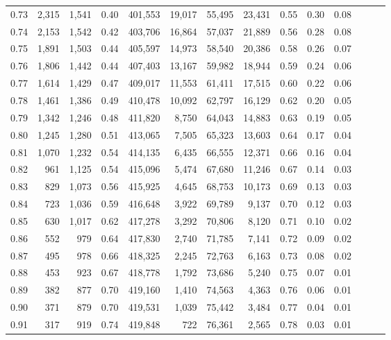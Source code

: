 \begin{tabular}{rrrrrrrrrrrrrr}
0.73 &  2,315 &  1,541 &  0.40 &  401,553 &   19,017 &  55,495 &  23,431 &  0.55 &  0.30 &      0.08 \\
0.74 &  2,153 &  1,542 &  0.42 &  403,706 &   16,864 &  57,037 &  21,889 &  0.56 &  0.28 &      0.08 \\
0.75 &  1,891 &  1,503 &  0.44 &  405,597 &   14,973 &  58,540 &  20,386 &  0.58 &  0.26 &      0.07 \\
0.76 &  1,806 &  1,442 &  0.44 &  407,403 &   13,167 &  59,982 &  18,944 &  0.59 &  0.24 &      0.06 \\
0.77 &  1,614 &  1,429 &  0.47 &  409,017 &   11,553 &  61,411 &  17,515 &  0.60 &  0.22 &      0.06 \\
0.78 &  1,461 &  1,386 &  0.49 &  410,478 &   10,092 &  62,797 &  16,129 &  0.62 &  0.20 &      0.05 \\
0.79 &  1,342 &  1,246 &  0.48 &  411,820 &    8,750 &  64,043 &  14,883 &  0.63 &  0.19 &      0.05 \\
0.80 &  1,245 &  1,280 &  0.51 &  413,065 &    7,505 &  65,323 &  13,603 &  0.64 &  0.17 &      0.04 \\
0.81 &  1,070 &  1,232 &  0.54 &  414,135 &    6,435 &  66,555 &  12,371 &  0.66 &  0.16 &      0.04 \\
0.82 &    961 &  1,125 &  0.54 &  415,096 &    5,474 &  67,680 &  11,246 &  0.67 &  0.14 &      0.03 \\
0.83 &    829 &  1,073 &  0.56 &  415,925 &    4,645 &  68,753 &  10,173 &  0.69 &  0.13 &      0.03 \\
0.84 &    723 &  1,036 &  0.59 &  416,648 &    3,922 &  69,789 &   9,137 &  0.70 &  0.12 &      0.03 \\
0.85 &    630 &  1,017 &  0.62 &  417,278 &    3,292 &  70,806 &   8,120 &  0.71 &  0.10 &      0.02 \\
0.86 &    552 &    979 &  0.64 &  417,830 &    2,740 &  71,785 &   7,141 &  0.72 &  0.09 &      0.02 \\
0.87 &    495 &    978 &  0.66 &  418,325 &    2,245 &  72,763 &   6,163 &  0.73 &  0.08 &      0.02 \\
0.88 &    453 &    923 &  0.67 &  418,778 &    1,792 &  73,686 &   5,240 &  0.75 &  0.07 &      0.01 \\
0.89 &    382 &    877 &  0.70 &  419,160 &    1,410 &  74,563 &   4,363 &  0.76 &  0.06 &      0.01 \\
0.90 &    371 &    879 &  0.70 &  419,531 &    1,039 &  75,442 &   3,484 &  0.77 &  0.04 &      0.01 \\
0.91 &    317 &    919 &  0.74 &  419,848 &      722 &  76,361 &   2,565 &  0.78 &  0.03 &      0.01 \\

\end{tabular}
